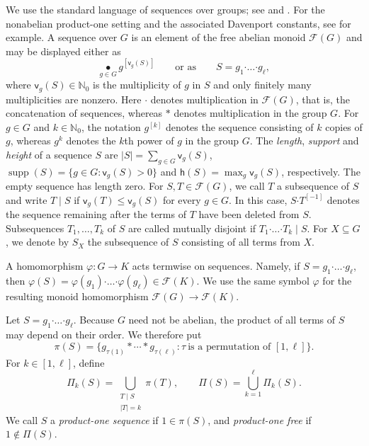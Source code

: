 \documentclass[a4paper, 12pt]{article}
\theoremstyle{definition}
\DeclareMathOperator{\supp}{supp}
\begin{document}
We use the standard language of sequences over groups;  see \cite{GaoGeroldingersurvey}
 and \cite[Chapter 5]{GHK}. For the
nonabelian product-one setting and the associated Davenport constants,
see \cite{GeroldingerGrynkiewicz2013} for example. A sequence over
$G$ is an element of the free abelian monoid $\mathcal F(G)$ and may be displayed either as
$$\mathop{\bullet}\limits_{g\in G} g^{[\mathsf v_g(S)]}
\qquad\text{or as}\qquad
S=g_1\boldsymbol{\cdot}\ldots\boldsymbol{\cdot}g_\ell,$$
where $\mathsf v_g(S)\in\mathbb N_0$ is the multiplicity of $g$ in $S$
and only finitely many multiplicities are nonzero. Here $\boldsymbol{\cdot}$ denotes multiplication in
$\mathcal F(G)$, that is, the concatenation of sequences, whereas
$\ast$ denotes multiplication in the group $G$. For $g\in G$ and $k\in\mathbb N_0$, the notation $g^{[k]}$ denotes
the sequence consisting of $k$ copies of $g$, whereas $g^k$ denotes
the $k$th power of $g$ in the group $G$.
The {\sl length}, {\sl support} and  {\sl height} of a sequence $S$ are
$|S|=\sum_{g\in G}\mathsf v_g(S)$, $\supp(S)=\{g\in G:\mathsf v_g(S)>0\}$ and $\mathsf h(S)=\max_{g}\mathsf v_g(S)$, respectively. The empty sequence has length
zero. For $S,T\in\mathcal F(G)$, we call $T$ a subsequence of $S$ and  write $T\mid S$ if
$\mathsf v_g(T)\leq\mathsf v_g(S)$ for every $g\in G$.  In this case,
$S\boldsymbol{\cdot}T^{[-1]}$ denotes the sequence remaining after the
terms of $T$ have been deleted from $S$. Subsequences $T_1,\ldots,T_k$ of
$S$ are called mutually disjoint if
$T_1\boldsymbol{\cdot}\ldots\boldsymbol{\cdot}T_k\mid S.$
For $X\subseteq G$, we denote by $S_X$ the subsequence of $S$
consisting of all terms from $X$.

A homomorphism $\varphi:G\to K$ acts termwise on sequences.  Namely, if
$S=g_1\boldsymbol{\cdot}\ldots\boldsymbol{\cdot}g_\ell$, then
$\varphi(S)=\varphi(g_1)\boldsymbol{\cdot}\ldots
\boldsymbol{\cdot}\varphi(g_\ell)\in\mathcal F(K).$
We use the same symbol $\varphi$ for the resulting monoid homomorphism
$\mathcal F(G)\to\mathcal F(K)$.

Let $S=g_1\boldsymbol{\cdot}\ldots\boldsymbol{\cdot}g_\ell$.  Because
$G$ need not be abelian, the product of all terms of $S$ may depend on
their order.  We therefore put
$$\pi(S)=
\bigl\{
g_{\tau(1)}\ast \cdots\ast g_{\tau(\ell)}:
\tau\ \text{is a permutation of }[1,\ell]
\bigr\}.$$
For $k\in[1,\ell]$, define
$$\Pi_k(S)=
\bigcup_{\substack{T\mid S\\ |T|=k}}\pi(T),
\qquad
\Pi(S)=\bigcup_{k=1}^{\ell}\Pi_k(S).$$
We call $S$ a \emph{product-one sequence} if
$1\in\pi(S)$, and \emph{product-one free} if $1\notin\Pi(S)$.
\end{document}
